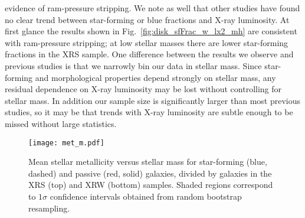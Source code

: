 evidence of ram-pressure stripping.  We note as well that other
studies \citep[e.g.][]{balogh2002a, fairley2002, wake2005, lopes2014}
have found no clear trend between star-forming or blue fractions and
X-ray luminosity.  At first glance the results shown in
Fig.~\ref{fig:disk_sfFrac_w_lx2_mh} are consistent with ram-pressure
stripping; at low stellar masses there are lower star-forming
fractions in the XRS sample.  One difference between the results we
observe and previous studies is that we narrowly bin our data in
stellar mass.  Since star-forming and morphological properties depend
strongly on stellar mass, any residual dependence on X-ray luminosity
may be lost without controlling for stellar mass.  In addition our
sample size is significantly larger than most previous studies, so it
may be that trends with X-ray luminosity are subtle enough to be
missed without large statistics.

\begin{figure}[!tp]
  \centering
  \texttt{[image: met\_m.pdf]}
  \caption[Mean stellar metallicity versus stellar mass for
    star-forming and passive galaxies divided by galaxies in the XRS
    and XRW samples]{Mean stellar metallicity versus stellar mass for
    star-forming (blue, dashed) and passive (red, solid) galaxies,
    divided by galaxies in the XRS (top) and XRW (bottom) samples.
    Shaded regions correspond to $1\sigma$ confidence intervals
    obtained from random bootstrap resampling.}
  \label{fig:met_m}
\end{figure}

